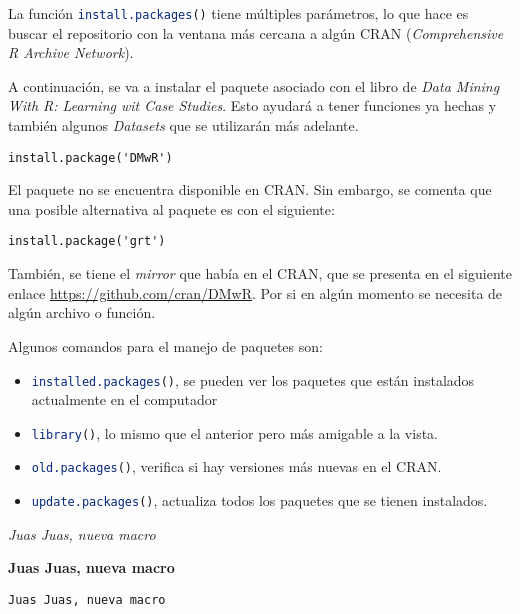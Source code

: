 \documentclass{article}
\begin{document}
La función \lstinline[language=R]{install.packages()} tiene múltiples parámetros, lo que hace es buscar el repositorio con la
ventana más cercana a algún CRAN (\textit{Comprehensive R Archive Network}).

A continuación, se va a instalar el paquete asociado con el libro de \textit{Data Mining With R: Learning wit Case Studies}. Esto ayudará a tener funciones ya hechas y también algunos \textit{Datasets} que se utilizarán más adelante.
\begin{lstlisting}
install.package('DMwR')
\end{lstlisting}

El paquete no se encuentra disponible en CRAN. Sin embargo, se comenta que una posible alternativa al paquete es con el siguiente:
\begin{lstlisting}
install.package('grt')
\end{lstlisting}

También, se tiene el \textit{mirror} que había en el CRAN, que se presenta en el siguiente enlace
\url{https://github.com/cran/DMwR}. Por si en algún momento se necesita de algún archivo o función.

Algunos comandos para el manejo de paquetes son:
\begin{itemize}
  \item \lstinline[language=R]{installed.packages()}, se pueden ver los paquetes que están instalados actualmente en el computador
  \item \lstinline[language=R]{library()}, lo mismo que el anterior pero más amigable a la vista.
  \item \lstinline[language=R]{old.packages()}, verifica si hay versiones más nuevas en el CRAN.
  \item \lstinline[language=R]{update.packages()}, actualiza todos los paquetes que se tienen instalados.
\end{itemize}


\textit{Juas Juas, nueva macro}

\textbf{Juas Juas, nueva macro}

\texttt{Juas Juas, nueva macro}
\end{document}
